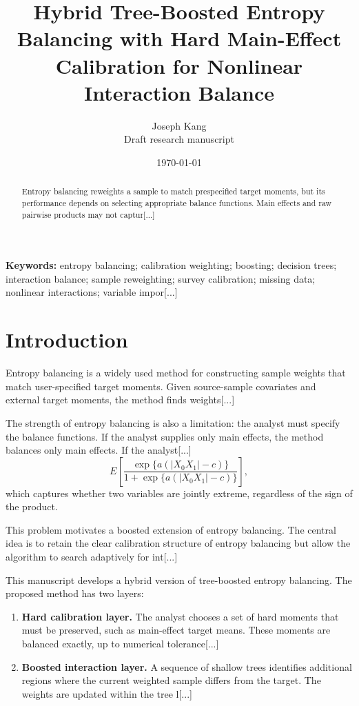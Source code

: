 \documentclass[11pt]{article}
\title{Hybrid Tree-Boosted Entropy Balancing with Hard Main-Effect Calibration for Nonlinear Interaction Balance}
\author{Joseph Kang\\\small Draft research manuscript}
\date{\today}
\begin{document}
\maketitle

\begin{abstract}
Entropy balancing reweights a sample to match prespecified target moments, but its performance depends on selecting appropriate balance functions. Main effects and raw pairwise products may not captur[...]
\end{abstract}

\textbf{Keywords:} entropy balancing; calibration weighting; boosting; decision trees; interaction balance; sample reweighting; survey calibration; missing data; nonlinear interactions; variable impor[...]

\newpage
\tableofcontents
\newpage

\section{Introduction}

Entropy balancing is a widely used method for constructing sample weights that match user-specified target moments. Given source-sample covariates and external target moments, the method finds weights[...] 

The strength of entropy balancing is also a limitation: the analyst must specify the balance functions. If the analyst supplies only main effects, the method balances only main effects. If the analyst[...]
\begin{equation*}
E\left[\frac{\exp\{a(|X_0X_1|-c)\}}{1+\exp\{a(|X_0X_1|-c)\}}\right],
\end{equation*}
which captures whether two variables are jointly extreme, regardless of the sign of the product.

This problem motivates a boosted extension of entropy balancing. The central idea is to retain the clear calibration structure of entropy balancing but allow the algorithm to search adaptively for int[...] 

This manuscript develops a hybrid version of tree-boosted entropy balancing. The proposed method has two layers:
\begin{enumerate}[leftmargin=2em]
\item \textbf{Hard calibration layer.} The analyst chooses a set of hard moments that must be preserved, such as main-effect target means. These moments are balanced exactly, up to numerical tolerance[...]
\item \textbf{Boosted interaction layer.} A sequence of shallow trees identifies additional regions where the current weighted sample differs from the target. The weights are updated within the tree l[...]
\end{enumerate}
\end{document}
